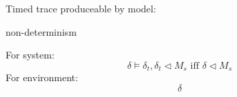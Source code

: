 \documentclass{llncs}
\begin{document}
Timed trace produceable by model:


non-determinism

For system:
$$\delta\models\delta_t,\delta_t\triangleleft M_s \text {  iff  } \delta\triangleleft M_s$$
For environment:
$$\delta$$
%
%
%
%
\end{document}
